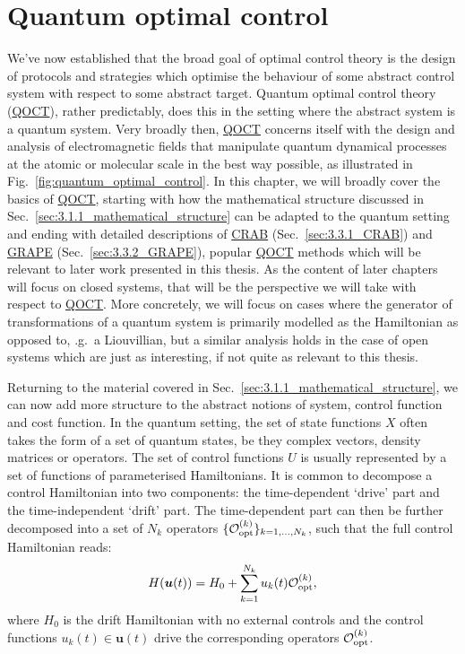 \documentclass[a4paper,oneside,11pt]{book}
\newcommand{\ubb}{\boldsymbol{u}}
\newcommand{\acrref}[1]{\hyperref[acr:#1]{#1}}
\begin{document}
\section{Quantum optimal control}\label{sec:3.2_Quantum_optimal_control}

We've now established that the broad goal of optimal control theory is the design of protocols and strategies which optimise the behaviour of some abstract control system with respect to some abstract target. Quantum optimal control theory (\acrref{QOCT}), rather predictably, does this in the setting where the abstract system is a quantum system. Very broadly then, \acrref{QOCT} concerns itself with the design and analysis of electromagnetic fields that manipulate quantum dynamical processes at the atomic or molecular scale in the best way possible, as illustrated in Fig.~\ref{fig:quantum_optimal_control}. In this chapter, we will broadly cover the basics of \acrref{QOCT}, starting with how the mathematical structure discussed in Sec.~\ref{sec:3.1.1_mathematical_structure} can be adapted to the quantum setting and ending with detailed descriptions of \acrref{CRAB} (Sec.~\ref{sec:3.3.1_CRAB}) and \acrref{GRAPE} (Sec.~\ref{sec:3.3.2_GRAPE}), popular \acrref{QOCT} methods which will be relevant to later work presented in this thesis. As the content of later chapters will focus on closed systems, that will be the perspective we will take with respect to \acrref{QOCT}. More concretely, we will focus on cases where the generator of transformations of a quantum system is primarily modelled as the Hamiltonian as opposed to, \@e.g.~a Liouvillian, but a similar analysis holds in the case of open systems which are just as interesting, if not quite as relevant to this thesis.

Returning to the material covered in Sec.~\ref{sec:3.1.1_mathematical_structure}, we can now add more structure to the abstract notions of system, control function and cost function. In the quantum setting, the set of state functions $X$ often takes the form of a set of quantum states, be they complex vectors, density matrices or operators. The set of control functions $U$ is usually represented by a set of functions of parameterised Hamiltonians. It is common to decompose a control Hamiltonian into two components: the time-dependent `drive' part and the time-independent `drift' part. The time-dependent part can then be further decomposed into a set of $N_k$ operators $\{\mathcal{O}_{\rm opt}^{(k)}\}_{k=1,...,N_k}$, such that the full control Hamiltonian reads:
\begin{equation}\label{eq:optimal_control_H}
    H(\ubb(t)) = H_0 + \sum_{k = 1}^{N_k} u_k(t) \mathcal{O}_{\rm opt}^{(k)},
\end{equation}
where $H_0$ is the drift Hamiltonian with no external controls and the control functions $u_k(t) \in \ubb(t)$ drive the corresponding operators $\mathcal{O}_{\rm opt}^{(k)}$.
\end{document}

